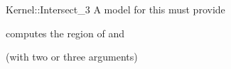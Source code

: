 \begin{ccRefFunctionObjectConcept}{Kernel::Intersect_3}
A model for this must provide


                 {computes the  region of  and }

\ccRefines
{} (with two or three arguments)

\ccSeeAlso
{}\\

\end{ccRefFunctionObjectConcept}
